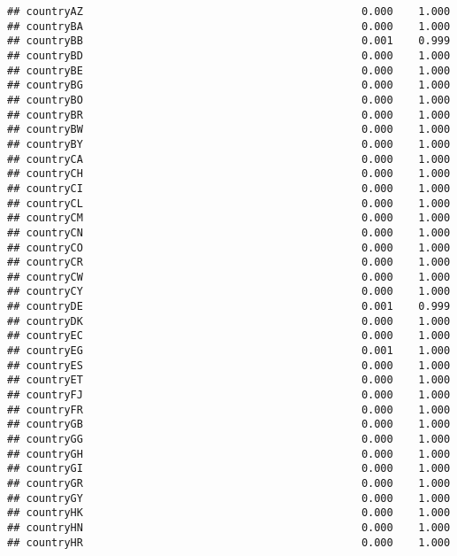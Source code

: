 \documentclass[
]{article}
\begin{document}
\begin{verbatim}
## countryAZ                                            0.000    1.000
## countryBA                                            0.000    1.000
## countryBB                                            0.001    0.999
## countryBD                                            0.000    1.000
## countryBE                                            0.000    1.000
## countryBG                                            0.000    1.000
## countryBO                                            0.000    1.000
## countryBR                                            0.000    1.000
## countryBW                                            0.000    1.000
## countryBY                                            0.000    1.000
## countryCA                                            0.000    1.000
## countryCH                                            0.000    1.000
## countryCI                                            0.000    1.000
## countryCL                                            0.000    1.000
## countryCM                                            0.000    1.000
## countryCN                                            0.000    1.000
## countryCO                                            0.000    1.000
## countryCR                                            0.000    1.000
## countryCW                                            0.000    1.000
## countryCY                                            0.000    1.000
## countryDE                                            0.001    0.999
## countryDK                                            0.000    1.000
## countryEC                                            0.000    1.000
## countryEG                                            0.001    1.000
## countryES                                            0.000    1.000
## countryET                                            0.000    1.000
## countryFJ                                            0.000    1.000
## countryFR                                            0.000    1.000
## countryGB                                            0.000    1.000
## countryGG                                            0.000    1.000
## countryGH                                            0.000    1.000
## countryGI                                            0.000    1.000
## countryGR                                            0.000    1.000
## countryGY                                            0.000    1.000
## countryHK                                            0.000    1.000
## countryHN                                            0.000    1.000
## countryHR                                            0.000    1.000

\end{verbatim}
\end{document}
